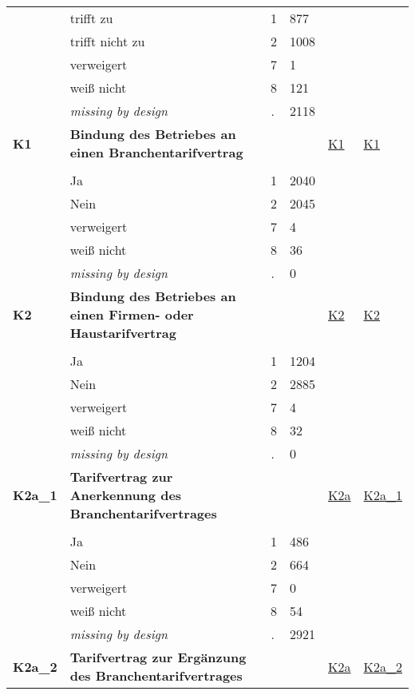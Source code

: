 \begin{longtable}{| L{2.45cm} | L{6cm} | C{1.5cm} | R{1cm} | C{2.25cm} | C{2.25cm} |}
   & trifft zu & 1 & 877 &  &  \\ 
   & trifft nicht zu & 2 & 1008 &  &  \\ 
   & verweigert & 7 & 1 &  &  \\ 
   & weiß nicht & 8 & 121 &  &  \\ 
   & \textit{missing by design} & \textit{.} & 2118 &  &  \\ 
   \midrule
\textbf{K1}\label{var:K1} & \textbf{Bindung des Betriebes an einen Branchentarifvertrag} &  &  & \hyperref[K1]{K1} & \hyperref[var:suf:K1]{K1} \\ 
   &  &  &  &  &  \\ 
   & Ja & 1 & 2040 &  &  \\ 
   & Nein & 2 & 2045 &  &  \\ 
   & verweigert & 7 & 4 &  &  \\ 
   & weiß nicht & 8 & 36 &  &  \\ 
   & \textit{missing by design} & \textit{.} & 0 &  &  \\ 
   \midrule
\textbf{K2}\label{var:K2} & \textbf{Bindung des Betriebes an einen Firmen- oder Haustarifvertrag} &  &  & \hyperref[K2]{K2} & \hyperref[var:suf:K2]{K2} \\ 
   &  &  &  &  &  \\ 
   & Ja & 1 & 1204 &  &  \\ 
   & Nein & 2 & 2885 &  &  \\ 
   & verweigert & 7 & 4 &  &  \\ 
   & weiß nicht & 8 & 32 &  &  \\ 
   & \textit{missing by design} & \textit{.} & 0 &  &  \\ 
   \midrule
\textbf{K2a\_1}\label{var:K2a:1} & \textbf{Tarifvertrag zur Anerkennung des Branchentarifvertrages} &  &  & \hyperref[K2a]{K2a} & \hyperref[var:suf:K2a:1]{K2a\_1} \\ 
   &  &  &  &  &  \\ 
   & Ja & 1 & 486 &  &  \\ 
   & Nein & 2 & 664 &  &  \\ 
   & verweigert & 7 & 0 &  &  \\ 
   & weiß nicht & 8 & 54 &  &  \\ 
   & \textit{missing by design} & \textit{.} & 2921 &  &  \\ 
   \midrule
\textbf{K2a\_2}\label{var:K2a:2} & \textbf{Tarifvertrag zur Ergänzung des Branchentarifvertrages} &  &  & \hyperref[K2a]{K2a} & \hyperref[var:suf:K2a:2]{K2a\_2} \\ 

\end{longtable}
